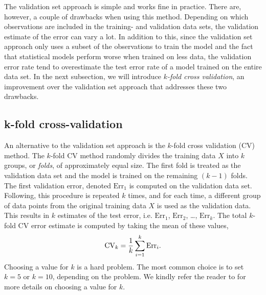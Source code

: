 The validation set approach is simple and works fine in practice. There are, however, a couple of drawbacks when using this method. Depending on which observations are included in the training- and validation data sets, the validation estimate of the error can vary a lot. In addition to this, since the validation set approach only uses a subset of the observations to train the model and the fact that statistical models perform worse when trained on less data, the validation error rate tend to overestimate the test error rate of a model trained on the entire data set. In the next subsection, we will introduce \textit{$k$-fold cross validation}, an improvement over the validation set approach that addresses these two drawbacks.

\subsection{k-fold cross-validation}
\label{sec:cross-validation}
An alternative to the validation set approach is the $k$-fold cross validation (CV) method. The $k$-fold CV method randomly divides the training data $X$ into $k$ groups, or \textit{folds}, of approximately equal size. The first fold is treated as the validation data set and the model is trained on the remaining $(k - 1)$ folds. The first validation error, denoted $\text{Err}_1$ is computed on the validation data set. Following, this procedure is repeated $k$ times, and for each time, a different group of data points from the original training data $X$ is used as the validation data. This results in $k$ estimates of the test error, i.e. $\text{Err}_1$, $\text{Err}_2$, \ldots, $\text{Err}_k$. The total $k$-fold CV error estimate is computed by taking the mean of these values,
\begin{align}
    \text{CV}_k = \frac{1}{k} \sum\limits_{i=1}^{k} \text{Err}_i.
\end{align}
Choosing a value for $k$ is a hard problem. The most common choice is to set $k=5$ or $k=10$, depending on the problem. We kindly refer the reader to \cite[Section 5.1.4]{James2013} for more details on choosing a value for $k$.

